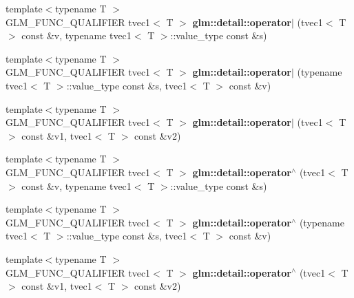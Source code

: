 \begin{DoxyCompactItemize}
\item 
\hypertarget{namespaceglm_1_1detail_a2dd5b31e72e98dd829d0c59e444cde9f}{{\footnotesize template$<$typename T $>$ }\\\-G\-L\-M\-\_\-\-F\-U\-N\-C\-\_\-\-Q\-U\-A\-L\-I\-F\-I\-E\-R tvec1$<$ \-T $>$ {\bfseries glm\-::detail\-::operator$|$} (tvec1$<$ \-T $>$ const \&v, typename tvec1$<$ \-T $>$\-::value\-\_\-type const \&s)}\label{namespaceglm_1_1detail_a2dd5b31e72e98dd829d0c59e444cde9f}

\item 
\hypertarget{namespaceglm_1_1detail_a67eb55f8dc726ed768270c88e38415c4}{{\footnotesize template$<$typename T $>$ }\\\-G\-L\-M\-\_\-\-F\-U\-N\-C\-\_\-\-Q\-U\-A\-L\-I\-F\-I\-E\-R tvec1$<$ \-T $>$ {\bfseries glm\-::detail\-::operator$|$} (typename tvec1$<$ \-T $>$\-::value\-\_\-type const \&s, tvec1$<$ \-T $>$ const \&v)}\label{namespaceglm_1_1detail_a67eb55f8dc726ed768270c88e38415c4}

\item 
\hypertarget{namespaceglm_1_1detail_a83797a3d1074a697423d0dd416b8a6d1}{{\footnotesize template$<$typename T $>$ }\\\-G\-L\-M\-\_\-\-F\-U\-N\-C\-\_\-\-Q\-U\-A\-L\-I\-F\-I\-E\-R tvec1$<$ \-T $>$ {\bfseries glm\-::detail\-::operator$|$} (tvec1$<$ \-T $>$ const \&v1, tvec1$<$ \-T $>$ const \&v2)}\label{namespaceglm_1_1detail_a83797a3d1074a697423d0dd416b8a6d1}

\item 
\hypertarget{namespaceglm_1_1detail_a3e9ecd067dd9b3fc5ea95bf53777a1f0}{{\footnotesize template$<$typename T $>$ }\\\-G\-L\-M\-\_\-\-F\-U\-N\-C\-\_\-\-Q\-U\-A\-L\-I\-F\-I\-E\-R tvec1$<$ \-T $>$ {\bfseries glm\-::detail\-::operator$^\wedge$} (tvec1$<$ \-T $>$ const \&v, typename tvec1$<$ \-T $>$\-::value\-\_\-type const \&s)}\label{namespaceglm_1_1detail_a3e9ecd067dd9b3fc5ea95bf53777a1f0}

\item 
\hypertarget{namespaceglm_1_1detail_a38abb9ca72295b5e102516ad4ff2d568}{{\footnotesize template$<$typename T $>$ }\\\-G\-L\-M\-\_\-\-F\-U\-N\-C\-\_\-\-Q\-U\-A\-L\-I\-F\-I\-E\-R tvec1$<$ \-T $>$ {\bfseries glm\-::detail\-::operator$^\wedge$} (typename tvec1$<$ \-T $>$\-::value\-\_\-type const \&s, tvec1$<$ \-T $>$ const \&v)}\label{namespaceglm_1_1detail_a38abb9ca72295b5e102516ad4ff2d568}

\item 
\hypertarget{namespaceglm_1_1detail_a08d05d54da1a8f9cd0c1dfc620d24540}{{\footnotesize template$<$typename T $>$ }\\\-G\-L\-M\-\_\-\-F\-U\-N\-C\-\_\-\-Q\-U\-A\-L\-I\-F\-I\-E\-R tvec1$<$ \-T $>$ {\bfseries glm\-::detail\-::operator$^\wedge$} (tvec1$<$ \-T $>$ const \&v1, tvec1$<$ \-T $>$ const \&v2)}\label{namespaceglm_1_1detail_a08d05d54da1a8f9cd0c1dfc620d24540}


\end{DoxyCompactItemize}

